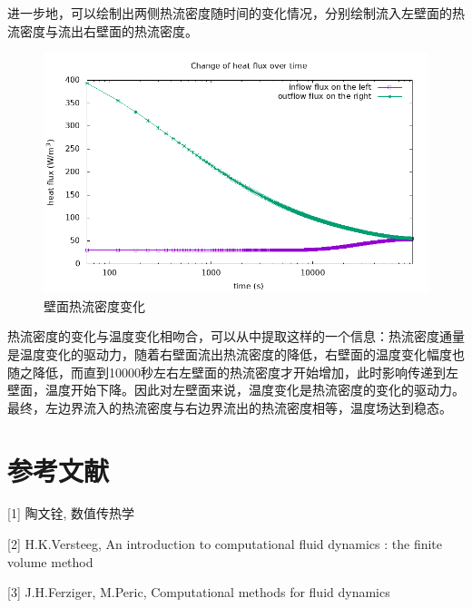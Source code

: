 \documentclass[10pt]{scrartcl}
\begin{document}
进一步地，可以绘制出两侧热流密度随时间的变化情况，分别绘制流入左壁面的热流密度与流出右壁面的热流密度。
\begin{figure}[H]
	\centering
	\includegraphics[width=0.7\linewidth]{flux}
	\caption{壁面热流密度变化}
	\label{fig:flux}
\end{figure}
热流密度的变化与温度变化相吻合，可以从中提取这样的一个信息：热流密度通量是温度变化的驱动力，随着右壁面流出热流密度的降低，右壁面的温度变化幅度也随之降低，而直到10000秒左右左壁面的热流密度才开始增加，此时影响传递到左壁面，温度开始下降。因此对左壁面来说，温度变化是热流密度的变化的驱动力。最终，左边界流入的热流密度与右边界流出的热流密度相等，温度场达到稳态。


\section{参考文献}
[1] 陶文铨, 数值传热学

[2] H.K.Versteeg, An introduction to computational fluid dynamics : the finite volume method

[3] J.H.Ferziger, M.Peric, Computational methods for fluid dynamics
\end{document}
